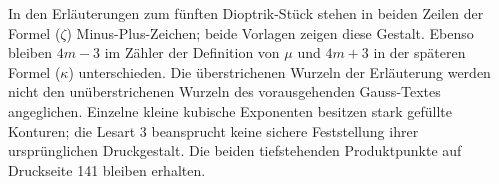 In den Erläuterungen zum fünften Dioptrik-Stück stehen in beiden Zeilen der Formel ($\zeta$) Minus-Plus-Zeichen; beide Vorlagen zeigen diese Gestalt. Ebenso bleiben $4m-3$ im Zähler der Definition von $\mu$ und $4m+3$ in der späteren Formel ($\kappa$) unterschieden. Die überstrichenen Wurzeln der Erläuterung werden nicht den unüberstrichenen Wurzeln des vorausgehenden Gauss-Textes angeglichen. Einzelne kleine kubische Exponenten besitzen stark gefüllte Konturen; die Lesart 3 beansprucht keine sichere Feststellung ihrer ursprünglichen Druckgestalt. Die beiden tiefstehenden Produktpunkte auf Druckseite 141 bleiben erhalten.
